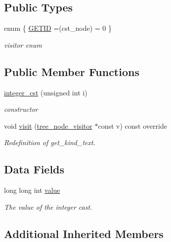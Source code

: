 \subsection*{Public Types}
\begin{DoxyCompactItemize}
\item 
enum \{ \hyperlink{structinteger__cst_a6e9d0b904a8d4df919420f3bd592f2eba93f629accd52e2a6199c4d10fe560b91}{G\+E\+T\+ID} =(cst\+\_\+node) = 0
 \}\begin{DoxyCompactList}\small\item\em visitor enum \end{DoxyCompactList}
\end{DoxyCompactItemize}
\subsection*{Public Member Functions}
\begin{DoxyCompactItemize}
\item 
\hyperlink{structinteger__cst_a9a9bfe3c8805b4db1d6edb1570091feb}{integer\+\_\+cst} (unsigned int i)
\begin{DoxyCompactList}\small\item\em constructor \end{DoxyCompactList}\item 
void \hyperlink{structinteger__cst_a9cf8f2538b55564a1064ed928fdd5dc1}{visit} (\hyperlink{classtree__node__visitor}{tree\+\_\+node\+\_\+visitor} $\ast$const v) const override
\begin{DoxyCompactList}\small\item\em Redefinition of get\+\_\+kind\+\_\+text. \end{DoxyCompactList}\end{DoxyCompactItemize}
\subsection*{Data Fields}
\begin{DoxyCompactItemize}
\item 
long long int \hyperlink{structinteger__cst_ab58ecb061cc1565a9293ee216acd28d4}{value}
\begin{DoxyCompactList}\small\item\em The value of the integer cast. \end{DoxyCompactList}\end{DoxyCompactItemize}
\subsection*{Additional Inherited Members}


